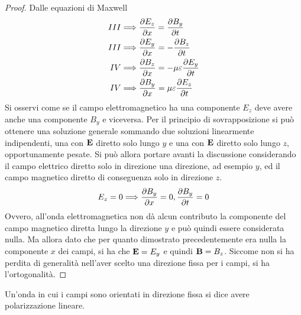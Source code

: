 \begin{proof}
    Dalle equazioni di Maxwell
    \[
        \begin{split}
            III & \Longrightarrow \pdv{E_z}{x}=\pdv{B_y}{t} \\
            III & \Longrightarrow \pdv{E_y}{x}=-\pdv{B_z}{t} \\
             IV & \Longrightarrow \pdv{B_z}{x}=- \mu\varepsilon \pdv{E_y}{t} \\
             IV & \Longrightarrow \pdv{B_y}{x}=\mu\varepsilon \pdv{E_z}{t} \\
        \end{split}
    \]
    Si osservi come se il campo elettromagnetico ha una componente $E_z$ deve avere anche una componente $B_y$
    e viceversa. Per il principio di sovrapposizione si può ottenere una soluzione generale
    sommando due soluzioni linearmente indipendenti, una con $\vb{E}$ diretto solo lungo $y$ e una con
    $\vb{E}$ diretto solo lungo $z$, opportunamente pesate.
    Si può allora portare avanti la discussione considerando il campo elettrico diretto solo in direzione
    una direzione, ad esempio $y$, ed il campo magnetico diretto di conseguenza solo in direzione $z$.
    \[
        E_z=0 \Longrightarrow \pdv{B_y}{x}=0,\pdv{B_y}{t}=0
    \]
    Ovvero, all'onda elettromagnetica non dà alcun contributo la componente del campo magnetico diretta lungo la direzione $y$
    e può quindi essere considerata nulla. Ma allora dato che per quanto dimostrato precedentemente era nulla la componente $x$
    dei campi, si ha che $\vb{E}=E_y$ e quindi $\vb{B}=B_z$. Siccome non si ha perdita di generalità nell'aver scelto una direzione
    fissa per i campi, si ha l'ortogonalità.
\end{proof}
Un'onda in cui i campi sono orientati in direzione fissa si dice avere polarizzazione lineare.

